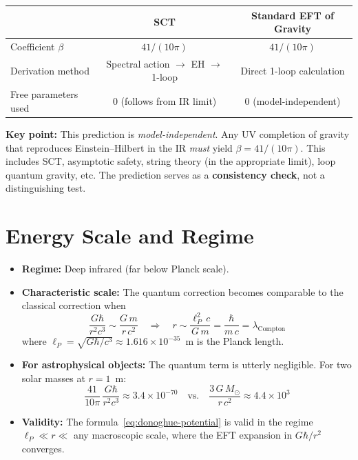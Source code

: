 \documentclass[11pt,a4paper]{article}
\begin{document}
\begin{center}
\begin{tabular}{lcc}
  \toprule
  & \textbf{SCT} & \textbf{Standard EFT of Gravity} \\
  \midrule
  Coefficient $\beta$ & $41/(10\pi)$ & $41/(10\pi)$ \\
  Derivation method & Spectral action $\to$ EH $\to$ 1-loop & Direct 1-loop calculation \\
  Free parameters used & 0 (follows from IR limit) & 0 (model-independent) \\
  \bottomrule
\end{tabular}
\end{center}

\vspace{0.5em}
\noindent
\textbf{Key point:} This prediction is \emph{model-independent}. Any UV completion of gravity that reproduces Einstein--Hilbert in the IR \emph{must} yield $\beta = 41/(10\pi)$. This includes SCT, asymptotic safety, string theory (in the appropriate limit), loop quantum gravity, etc. The prediction serves as a \textbf{consistency check}, not a distinguishing test.

\section{Energy Scale and Regime}

\begin{itemize}[leftmargin=2em]
  \item \textbf{Regime:} Deep infrared (far below Planck scale).
  \item \textbf{Characteristic scale:} The quantum correction becomes comparable to the classical correction when
    \begin{equation}
      \frac{G\hbar}{r^2 c^3} \sim \frac{G\,m}{r\,c^2}
      \quad\Longrightarrow\quad
      r \sim \frac{\ell_P^2\,c}{G\,m} = \frac{\hbar}{m\,c} = \lambda_{\text{Compton}}
    \end{equation}
    where $\ell_P = \sqrt{G\hbar/c^3} \approx 1.616 \times 10^{-35}$~m is the Planck length.
  \item \textbf{For astrophysical objects:} The quantum term is utterly negligible. For two solar masses at $r = 1$~m:
    \begin{equation}
      \frac{41}{10\pi}\,\frac{G\hbar}{r^2 c^3} \approx 3.4 \times 10^{-70}
      \quad\text{vs.}\quad
      \frac{3\,G\,M_\odot}{r\,c^2} \approx 4.4 \times 10^{3}
    \end{equation}
  \item \textbf{Validity:} The formula~\eqref{eq:donoghue-potential} is valid in the regime $\ell_P \ll r \ll$ any macroscopic scale, where the EFT expansion in $G\hbar/r^2$ converges.
\end{itemize}
\end{document}
